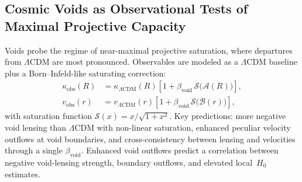 \subsection{Cosmic Voids as Observational Tests of Maximal Projective Capacity}
  \label{subsec:observational-tests-voids}

  Voids probe the regime of near-maximal projective saturation, where
  departures from $\Lambda$CDM are most pronounced.
  Observables are modeled as a $\Lambda$CDM baseline plus a
  Born--Infeld-like saturating correction:
  \begin{align}
    \kappa_{\mathrm{obs}}(R)
    &= \kappa_{\Lambda\mathrm{CDM}}(R)
    \left[
      1 + \beta_{\mathrm{void}}\,
      \mathcal{S}\!\big(\mathcal{A}(R)\big)
    \right], \\
    v_{\mathrm{obs}}(r)
    &= v_{\Lambda\mathrm{CDM}}(r)
    \left[
      1 + \beta_{\mathrm{void}}\,
      \mathcal{S}\!\big(\mathcal{B}(r)\big)
    \right],
  \end{align}
  with saturation function
  $\mathcal{S}(x) = x/\sqrt{1+x^2}$.
  Key predictions: more negative void lensing than $\Lambda$CDM with
  non-linear saturation, enhanced peculiar velocity outflows at void
  boundaries, and cross-consistency between lensing and velocities
  through a single $\beta_{\mathrm{void}}$.
  Enhanced void outflows predict a correlation between negative
  void-lensing strength, boundary outflows, and elevated local~$H_0$
  estimates.
